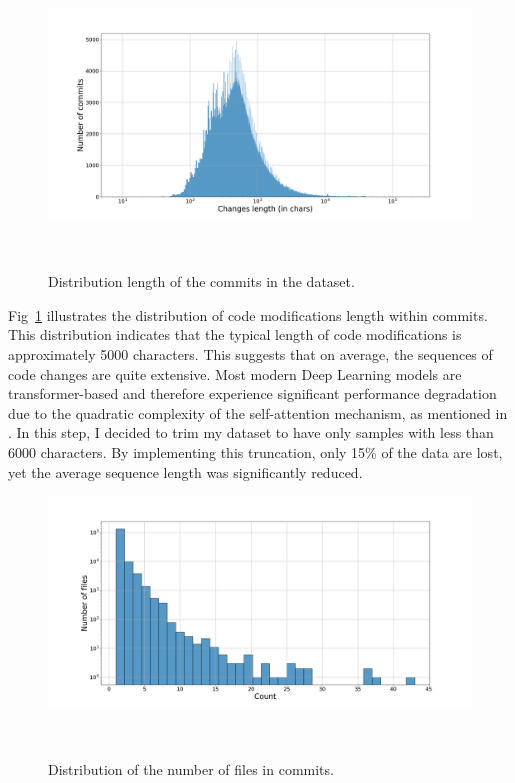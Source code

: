 \begin{figure}[H]
    \includegraphics[scale=0.30]{figs/changes_len_dist.png}
    \caption{Distribution length of the commits in the dataset.}~\label{fig:changes_len_dist}
\end{figure}
Fig~\ref{fig:changes_len_dist} illustrates the distribution of code modifications length within commits. This distribution indicates that the typical length of code modifications is approximately 5000 characters. This suggests that on average, the sequences of code changes are quite extensive. Most modern Deep Learning models are transformer-based and therefore experience significant performance degradation due to the quadratic complexity of the self-attention mechanism, as mentioned in {}\cite{keles2023computational}. In this step, I decided to trim my dataset to have only samples with less than 6000 characters. By implementing this truncation, only 15\% of the data are lost, yet the average sequence length was significantly reduced.
\begin{figure}[H]
    \includegraphics[scale=0.30]{figs/Commit num files distribution.png}
    \caption{Distribution of the number of files in commits.}~\label{fig:Commit num files distribution}
\end{figure}

